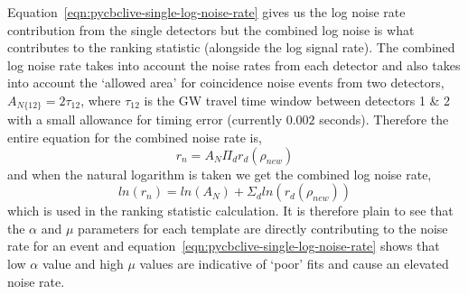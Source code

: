 Equation~\ref{eqn:pycbclive-single-log-noise-rate} gives us the log noise rate contribution from the single detectors but the combined log noise is what contributes to the ranking statistic (alongside the log signal rate). The combined log noise rate takes into account the noise rates from each detector and also takes into account the `allowed area' for coincidence noise events from two detectors, $A_{N\{12\}} = 2\tau_{12}$, where $\tau_{12}$ is the GW travel time window between detectors 1 \& 2 with a small allowance for timing error (currently $0.002$ seconds). Therefore the entire equation for the combined noise rate is,
%
\begin{equation}
    r_{n} = A_{N} \Pi_{d} r_{d}(\rho_{new})
\label{eqn:pycbclive-comb-noise-rate}
\end{equation}
%
and when the natural logarithm is taken we get the combined log noise rate,
%
\begin{equation}
    ln(r_{n}) = ln(A_{N}) +  \Sigma_{d} ln(r_{d}(\rho_{new}))
\label{eqn:pycbclive-comb-log-noise-rate}
\end{equation}
%
which is used in the ranking statistic calculation. It is therefore plain to see that the $\alpha$ and $\mu$ parameters for each template are directly contributing to the noise rate for an event and equation~\ref{eqn:pycbclive-single-log-noise-rate} shows that low $\alpha$ value and high $\mu$ values are indicative of `poor' fits and cause an elevated noise rate.

